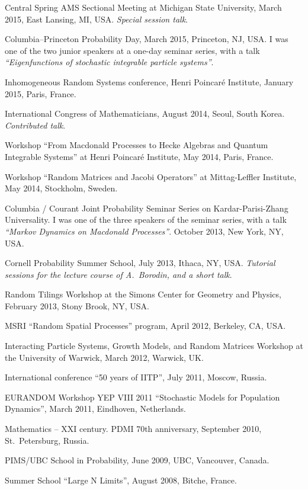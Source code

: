 \documentclass[letterpaper,11pt]{article}
\begin{document}
\begin{etaremune}
\item Central Spring AMS Sectional Meeting at Michigan State University, March 2015, East Lansing, MI, USA. \emph{Special session talk}.

\item Columbia--Princeton Probability Day, March 2015, Princeton, NJ, USA.
I was one of the two junior speakers at a one-day seminar series,
with a talk \emph{``Eigenfunctions of stochastic integrable particle systems''}.

\item Inhomogeneous Random Systems conference, Henri Poincar\'e Institute, January 2015, Paris, France.

\item International Congress of Mathematicians, August 2014, 
Seoul, South Korea. \emph{Contributed talk}.

\item Workshop 
``From Macdonald Processes to Hecke Algebras and Quantum Integrable Systems''
at Henri Poincar\'e Institute,
May 2014, Paris, France.

\item 
Workshop
``Random Matrices and Jacobi Operators''
at 
Mittag-Leffler Institute,
May 2014, Stockholm, Sweden.

\item
Columbia / Courant Joint Probability Seminar Series on Kardar-Parisi-Zhang Universality. 
I was one of the three speakers of the seminar series,
with a talk
\emph{``Markov Dynamics on Macdonald Processes''}.
October 2013, New York, NY, USA.

\item
Cornell Probability Summer School, July 2013, Ithaca, NY, USA.
\emph{Tutorial sessions for the lecture course of 
A.~Borodin, and a short talk}.

\item 
Random Tilings Workshop at the 
Simons Center for Geometry and Physics,
February 2013, Stony Brook, NY, USA.

\item  
MSRI ``Random Spatial Processes'' program,
April 2012, Berkeley, CA, USA.


\item 
Interacting Particle Systems, Growth Models, and Random Matrices Workshop at the University of Warwick, March 2012, Warwick, UK.


\item International conference ``50 years of IITP'', July 2011, Moscow, Russia.
  
\item EURANDOM Workshop YEP VIII 2011 ``Stochastic Models for Population Dynamics'', March 2011, Eindhoven, Netherlands.

\item Mathematics -- XXI century. PDMI 70th anniversary, September 2010, St.~Petersburg, Russia.

\item PIMS/UBC School in Probability, June 2009, UBC, Vancouver, Canada. 

\item 
Summer School ``Large N Limits'', August 2008, Bitche, France. 
\end{etaremune}
\end{document}
